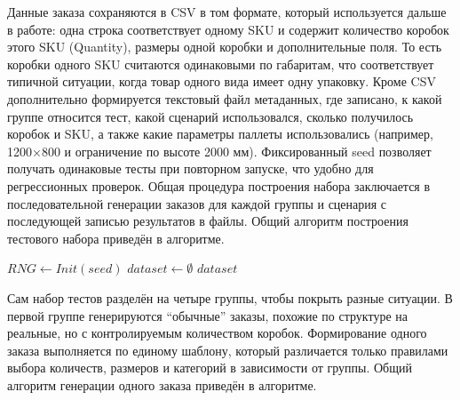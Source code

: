 Данные заказа сохраняются в CSV в том формате, который используется дальше в работе: одна строка соответствует одному SKU и содержит количество коробок этого SKU (Quantity), размеры одной коробки и дополнительные поля. То есть коробки одного SKU считаются одинаковыми по габаритам, что соответствует типичной ситуации, когда товар одного вида имеет одну упаковку. Кроме CSV дополнительно формируется текстовый файл метаданных, где записано, к какой группе относится тест, какой сценарий использовался, сколько получилось коробок и SKU, а также какие параметры паллеты использовались (например, 1200×800 и ограничение по высоте 2000 мм). Фиксированный seed позволяет получать одинаковые тесты при повторном запуске, что удобно для регрессионных проверок. Общая процедура построения набора заключается в последовательной генерации заказов для каждой группы и сценария с последующей записью результатов в файлы. Общий алгоритм построения тестового набора приведён в алгоритме.
\begin{algorithm}[H]
\caption{Generate the full test dataset (groups 1--4)}
$RNG \leftarrow Init(seed)$\;
$dataset \leftarrow \emptyset$\;
\Return $dataset$\;
\end{algorithm}


Сам набор тестов разделён на четыре группы, чтобы покрыть разные ситуации. В первой группе генерируются “обычные” заказы, похожие по структуре на реальные, но с контролируемым количеством коробок. Формирование одного заказа выполняется по единому шаблону, который различается только правилами выбора количеств, размеров и категорий в зависимости от группы. Общий алгоритм генерации одного заказа приведён в алгоритме.


